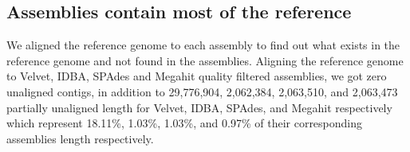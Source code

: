  
% 
%
%
%
%
%
   
\subsection*{Assemblies contain most of the reference} 
We aligned the reference genome to each assembly to find out what exists in the reference genome and not found in the assemblies. 
Aligning the reference genome to Velvet, IDBA, SPAdes and Megahit quality filtered assemblies, we got zero unaligned contigs, in addition to 29,776,904, 2,062,384, 2,063,510, and 2,063,473 partially unaligned length for Velvet, IDBA, SPAdes, and Megahit respectively which represent 18.11\%, 1.03\%, 1.03\%, and 0.97\% of their corresponding assemblies length respectively. 


